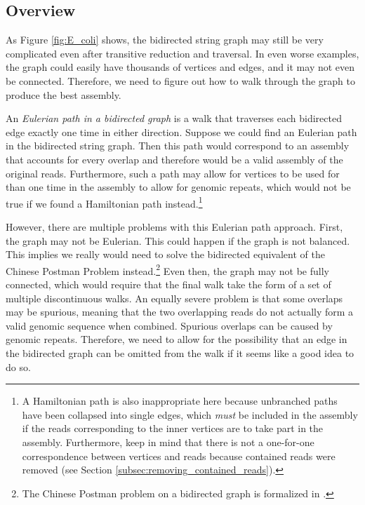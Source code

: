 \documentclass[12pt]{article}
\newcommand{\Figure}[1]{Figure \ref{#1}}
\newcommand{\Subsection}[1]{Section \ref{#1}}
\newcommand{\KeyTerm}[1]{{\it #1}}
\begin{document}
\label{sec:final}

\subsection{Overview}

As \Figure{fig:E_coli} shows, the bidirected string graph may still be very
complicated even after transitive reduction and traversal.  In even worse
examples, the graph could easily have thousands of vertices and edges, and it
may not even be connected.  Therefore, we need to figure out how to walk through
the graph to produce the best assembly.

An \KeyTerm{Eulerian path in a bidirected graph} is a walk that traverses each
bidirected edge exactly one time in either direction.  Suppose we could find an
Eulerian path in the bidirected string graph.  Then this path would correspond
to an assembly that accounts for every overlap and therefore would be a valid
assembly of the original reads.  Furthermore, such a path may allow for vertices
to be used for than one time in the assembly to allow for genomic repeats, which
would not be true if we found a Hamiltonian path instead.\footnote{A Hamiltonian
path is also inappropriate here because unbranched paths have been collapsed
into single edges, which {\em must} be included in the assembly if the reads
corresponding to the inner vertices are to take part in the assembly.
Furthermore, keep in mind that there is not a one-for-one correspondence between
vertices and reads because contained reads were removed (see
\Subsection{subsec:removing_contained_reads}).}

However, there are multiple problems with this Eulerian path approach.  First,
the graph may not be Eulerian.  This could happen if the graph is not balanced.
This implies we really would need to solve the bidirected equivalent of the
Chinese Postman Problem instead.\footnote{The Chinese Postman problem on a
bidirected graph is formalized in \cite{Medvedev2009}.}  Even then, the graph
may not be fully connected, which would require that the final walk take the
form of a set of multiple discontinuous walks.  An equally severe problem is
that some overlaps may be spurious, meaning that the two overlapping reads do
not actually form a valid genomic sequence when combined.  Spurious overlaps can
be caused by genomic repeats.  Therefore, we need to allow for the possibility
that an edge in the bidirected graph can be omitted from the walk if it seems
like a good idea to do so.
\end{document}
